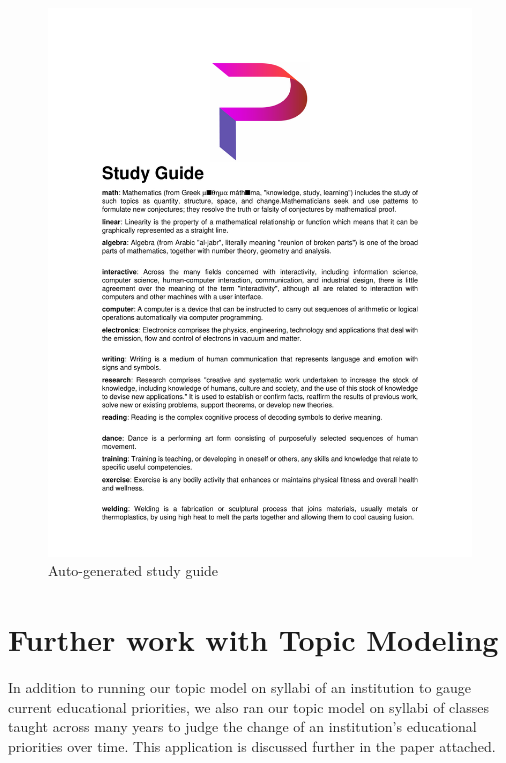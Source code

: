 \begin{figure}[H]
    \centering
    \includegraphics[scale = 0.5]{studyGuide_youJustMade.pdf}
    \caption{Auto-generated study guide}
    \label{fig:studyguide}
\end{figure}

\section{Further work with Topic Modeling}
In addition to running our topic model on syllabi of an institution to gauge current educational priorities, we also ran our topic model on syllabi of classes taught across many years to judge the change of an institution's educational priorities over time. This application is discussed further in the paper attached. 




